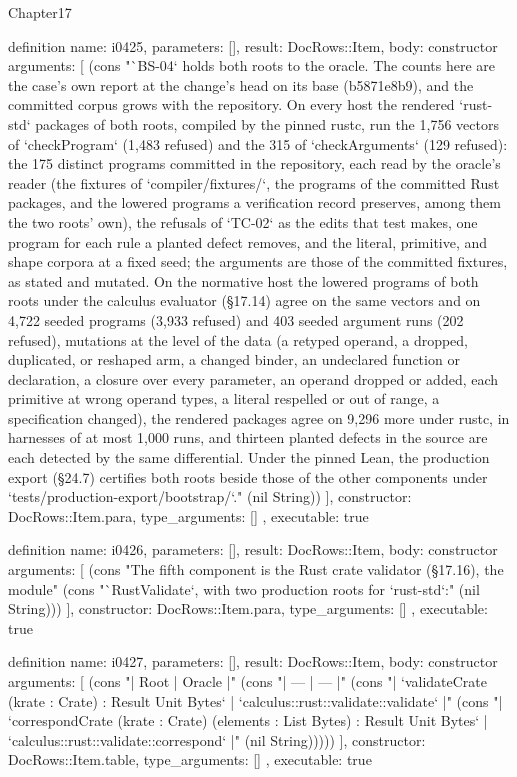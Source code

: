 \begin{lexlean}{Chapter17}
\begin{semanticmodule}
definition{
  name: i0425,
  parameters: [],
  result: DocRows::Item,
  body: constructor{
    arguments: [
      (cons "`BS-04` holds both roots to the oracle. The counts here are the case's own report at the change's head on its base (b5871e8b9), and the committed corpus grows with the repository. On every host the rendered `rust-std` packages of both roots, compiled by the pinned rustc, run the 1,756 vectors of `checkProgram` (1,483 refused) and the 315 of `checkArguments` (129 refused): the 175 distinct programs committed in the repository, each read by the oracle's reader (the fixtures of `compiler/fixtures/`, the programs of the committed Rust packages, and the lowered programs a verification record preserves, among them the two roots' own), the refusals of `TC-02` as the edits that test makes, one program for each rule a planted defect removes, and the literal, primitive, and shape corpora at a fixed seed; the arguments are those of the committed fixtures, as stated and mutated. On the normative host the lowered programs of both roots under the calculus evaluator (§17.14) agree on the same vectors and on 4,722 seeded programs (3,933 refused) and 403 seeded argument runs (202 refused), mutations at the level of the data (a retyped operand, a dropped, duplicated, or reshaped arm, a changed binder, an undeclared function or declaration, a closure over every parameter, an operand dropped or added, each primitive at wrong operand types, a literal respelled or out of range, a specification changed), the rendered packages agree on 9,296 more under rustc, in harnesses of at most 1,000 runs, and thirteen planted defects in the source are each detected by the same differential. Under the pinned Lean, the production export (§24.7) certifies both roots beside those of the other components under `tests/production-export/bootstrap/`." (nil String))
    ],
    constructor: DocRows::Item.para,
    type_arguments: []
  },
  executable: true
}

definition{
  name: i0426,
  parameters: [],
  result: DocRows::Item,
  body: constructor{
    arguments: [
      (cons "The fifth component is the Rust crate validator (§17.16), the module" (cons "`RustValidate`, with two production roots for `rust-std`:" (nil String)))
    ],
    constructor: DocRows::Item.para,
    type_arguments: []
  },
  executable: true
}

definition{
  name: i0427,
  parameters: [],
  result: DocRows::Item,
  body: constructor{
    arguments: [
      (cons "| Root | Oracle |" (cons "| --- | --- |" (cons "| `validateCrate (krate : Crate) : Result Unit Bytes` | `calculus::rust::validate::validate` |" (cons "| `correspondCrate (krate : Crate) (elements : List Bytes) : Result Unit Bytes` | `calculus::rust::validate::correspond` |" (nil String)))))
    ],
    constructor: DocRows::Item.table,
    type_arguments: []
  },
  executable: true
}


\end{semanticmodule}
\end{lexlean}

